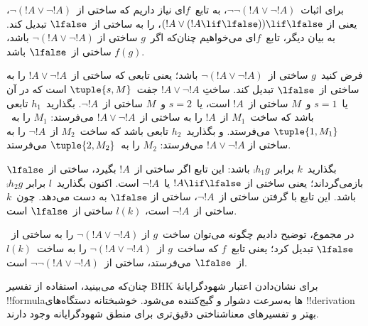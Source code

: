 \documentclass[../../../include/open-logic-section]{subfiles}
\begin{document}
\begin{ex}
برای اثبات~$\lnot \lnot (!A \lor \lnot !A)$، به تابع~$f$ای نیاز داریم
که ساختی از~$\lnot(!A \lor \lnot !A)$، یعنی از
$(!A \lor (!A \lif \lfalse)) \lif \lfalse$، را به ساختی از~$\lfalse$
تبدیل کند. به بیان دیگر، تابع~$f$ای می‌خواهیم چنان‌که اگر~$g$ ساختی از
$\lnot(!A \lor \lnot !A)$ باشد، $f(g)$ ساختی از~$\lfalse$ باشد.

فرض کنید~$g$ ساختی از~$\lnot(!A \lor \lnot !A)$ باشد؛ یعنی تابعی که
ساختی از~$!A \lor \lnot !A$ را به ساختی از~$\lfalse$ تبدیل کند. ساختِ
$!A \lor \lnot !A$ جفت~$\tuple{s, M}$ است که در آن یا~$s = 1$ و~$M$
ساختی از~$!A$ است، یا~$s = 2$ و~$M$ ساختی از~$\lnot !A$. بگذارید~$h_1$
تابعی باشد که ساخت~$M_1$ از~$!A$ را به ساختی از~$!A \lor \lnot !A$
می‌فرستد: $M_1$ را به~$\tuple{1, M_1}$ می‌فرستد. و بگذارید~$h_2$ تابعی
باشد که ساخت~$M_2$ از~$\lnot !A$ را به ساختی از
$!A \lor \lnot !A$ می‌فرستد: $M_2$ را به~$\tuple{2, M_2}$ می‌فرستد.

بگذارید~$k$ برابر~$\comp{h_1}{g}$ باشد: این تابع اگر ساختی از~$!A$
بگیرد، ساختی از~$\lfalse$ بازمی‌گرداند؛ یعنی ساختی از
$!A \lif \lfalse$ یا~$\lnot !A$ است. اکنون بگذارید~$l$ برابر
$\comp{h_2}{g}$ باشد. این تابع با گرفتن ساختی از~$\lnot !A$، ساختی از
$\lfalse$ به دست می‌دهد. چون~$k$ ساختی از~$\lnot !A$ است، $l(k)$
ساختی از~$\lfalse$ است.

در مجموع، توضیح دادیم چگونه می‌توان ساخت~$g$ از
$\lnot(!A \lor \lnot !A)$ را به ساختی از~$\lfalse$ تبدیل کرد؛ یعنی
تابع~$f$ که ساخت~$g$ از~$\lnot(!A \lor \lnot !A)$ را به ساخت~$l(k)$
از~$\lfalse$ می‌فرستد، ساختی از~$\lnot\lnot(!A \lor \lnot !A)$ است.
\end{ex}

چنان‌که می‌بینید، استفاده از تفسیر BHK برای نشان‌دادن اعتبار
شهودگرایانهٔ !!{formula}ها به‌سرعت دشوار و گیج‌کننده می‌شود. خوشبختانه
دستگاه‌های !!{derivation} بهتر و تفسیرهای معناشناختی دقیق‌تری برای منطق
شهودگرایانه وجود دارند.
\end{document}
